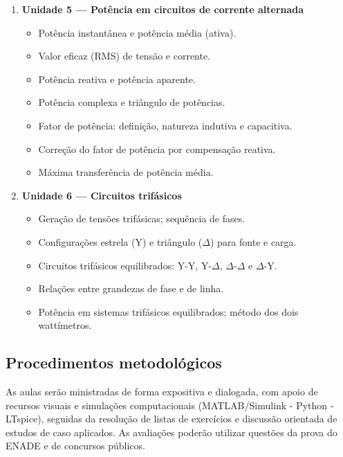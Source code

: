 \documentclass[oneside,a4paper,12pt]{article}
\begin{document}
\begin{enumerate}
    \item \textbf{Unidade 5 --- Potência em circuitos de corrente alternada}
    \begin{itemize}
      \item Potência instantânea e potência média (ativa).
      \item Valor eficaz (RMS) de tensão e corrente.
      \item Potência reativa e potência aparente.
      \item Potência complexa e triângulo de potências.
      \item Fator de potência: definição, natureza indutiva e capacitiva.
      \item Correção do fator de potência por compensação reativa.
      \item Máxima transferência de potência média.
    \end{itemize}

    \item \textbf{Unidade 6 --- Circuitos trifásicos}
    \begin{itemize}
      \item Geração de tensões trifásicas; sequência de fases.
      \item Configurações estrela (Y) e triângulo ($\Delta$) para fonte e carga.
      \item Circuitos trifásicos equilibrados: Y-Y, Y-$\Delta$, $\Delta$-$\Delta$ e $\Delta$-Y.
      \item Relações entre grandezas de fase e de linha.
      \item Potência em sistemas trifásicos equilibrados; método dos dois wattímetros.
    \end{itemize}
  \end{enumerate}



  \begin{snugshade}
  \section{Procedimentos metodológicos} %
  \end{snugshade}

As aulas serão ministradas de forma expositiva e dialogada, com apoio de recursos visuais e simulações computacionais (MATLAB/Simulink - Python - LTspice), seguidas da resolução de listas de exercícios e discussão orientada de estudos de caso aplicados. As avaliações poderão utilizar questões da prova do ENADE e de concursos públicos.
\end{document}
